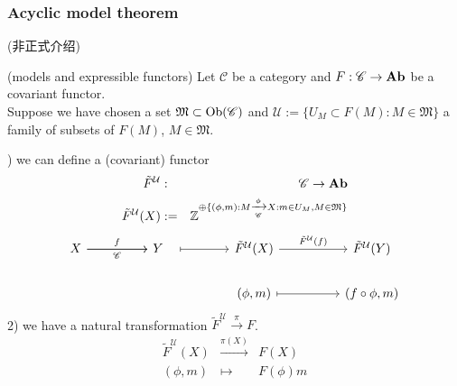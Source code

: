 \documentclass{article}
\begin{document}
\subsubsection{Acyclic model theorem\cite{eilenberg1953acyclic}}(非正式介绍)
\begin{definition}
    (models and expressible functors) Let $\mathscr{C}$ be a category and $F: \mathscr{C} \to \bold{Ab}$ be a covariant functor.\\
    Suppose we have chosen a set $\mathfrak{M} \subset \operatorname{Ob}(\mathscr{C})$ and $\mathcal{U} := \{U_M \subset F(M): M \in \mathfrak{M}\}$ a family of  subsets of $F(M)$, $M\in \mathfrak{M}$.
\end{definition}
) we can define a (covariant) functor
\begin{eqnarray*}
\tilde{F}^{\mathcal{U}} &:& \mathscr{C} \to \bold{Ab} \\
\tilde{F}^{\mathcal{U}}(X) &:=& \mathbb{Z}^{\oplus \{(\phi, m): M \xrightarrow[\mathscr{C}]{\phi}X : m \in U_M, M \in \mathfrak{M}\}}
\end{eqnarray*}
\[\begin{tikzcd}
	X && Y && {\tilde{F}^{\mathcal{U}}(X)} && {\tilde{F}^{\mathcal{U}}(Y)} \\
	&&&& {(\phi,m)} && {(f \circ \phi,m)}
	\arrow["f", from=1-1, to=1-3]
	\arrow["{\mathscr{C}}"', from=1-1, to=1-3]
	\arrow["{\tilde{F}^{\mathcal{U}}(f)}", from=1-5, to=1-7]
	\arrow[maps to, from=2-5, to=2-7]
	\arrow[shorten <=9pt, maps to, from=1-3, to=1-5]
\end{tikzcd}\]
2) we have a natural transformation $\tilde{F}^{\mathcal{U}} \xrightarrow{\pi}F$.
\begin{eqnarray*}
    \tilde{F}^{\mathcal{U}}(X) &\xrightarrow{\pi(X)}& F(X)\\
    (\phi,m) &\mapsto& F(\phi)m
\end{eqnarray*}
\end{document}

